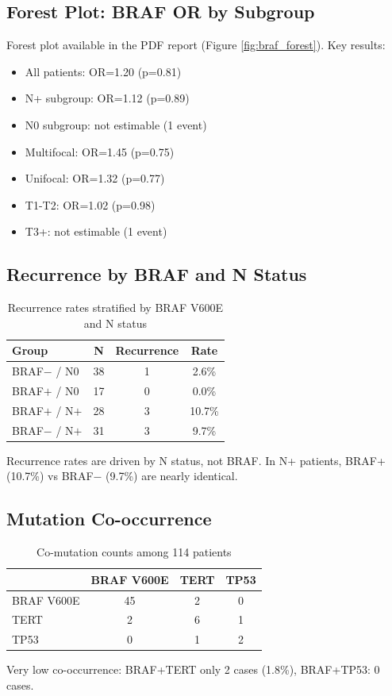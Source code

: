 \documentclass[12pt,a4paper]{article}
\begin{document}
\subsection{Forest Plot: BRAF OR by Subgroup}
Forest plot available in the PDF report (Figure \ref{fig:braf_forest}). Key results:
\begin{itemize}
  \item All patients: OR=1.20 (p=0.81)
  \item N+ subgroup: OR=1.12 (p=0.89)
  \item N0 subgroup: not estimable (1 event)
  \item Multifocal: OR=1.45 (p=0.75)
  \item Unifocal: OR=1.32 (p=0.77)
  \item T1-T2: OR=1.02 (p=0.98)
  \item T3+: not estimable (1 event)
\end{itemize}

\subsection{Recurrence by BRAF and N Status}
\begin{table}[H]
\centering
\caption{Recurrence rates stratified by BRAF V600E and N status}
\label{tab:braf_n}
\begin{tabular}{lccc}
\toprule
Group & N & Recurrence & Rate \\
\midrule
BRAF$-$ / N0 & 38 & 1 & 2.6\% \\
BRAF$+$ / N0 & 17 & 0 & 0.0\% \\
BRAF$+$ / N$+$ & 28 & 3 & 10.7\% \\
BRAF$-$ / N$+$ & 31 & 3 & 9.7\% \\
\bottomrule
\end{tabular}
\end{table}
Recurrence rates are driven by N status, not BRAF. In N+ patients, BRAF+ (10.7\%) vs BRAF$-$ (9.7\%) are nearly identical.

\subsection{Mutation Co-occurrence}
\begin{table}[H]
\centering
\caption{Co-mutation counts among 114 patients}
\label{tab:comut}
\begin{tabular}{lccc}
\toprule
 & BRAF V600E & TERT & TP53 \\
\midrule
BRAF V600E & 45 & 2 & 0 \\
TERT & 2 & 6 & 1 \\
TP53 & 0 & 1 & 2 \\
\bottomrule
\end{tabular}
\end{table}
Very low co-occurrence: BRAF+TERT only 2 cases (1.8\%), BRAF+TP53: 0 cases.
\end{document}
